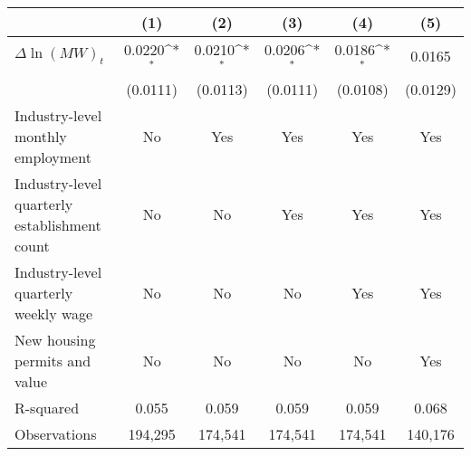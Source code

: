 {
\def\sym#1{\ifmmode^{#1}\else\(^{#1}\)\fi}
\begin{tabular}{l*{5}{c}}
\hline\hline
          &\multicolumn{1}{c}{(1)}         &\multicolumn{1}{c}{(2)}         &\multicolumn{1}{c}{(3)}         &\multicolumn{1}{c}{(4)}         &\multicolumn{1}{c}{(5)}         \\
\hline
$\Delta \ln(MW)_{t}$&   0.0220\sym{*}  &   0.0210\sym{*}  &   0.0206\sym{*}  &   0.0186\sym{*}  &   0.0165         \\
          & (0.0111)         & (0.0113)         & (0.0111)         & (0.0108)         & (0.0129)         \\
\hline
Industry-level monthly employment&       No         &      Yes         &      Yes         &      Yes         &      Yes         \\
Industry-level quarterly establishment count&       No         &       No         &      Yes         &      Yes         &      Yes         \\
Industry-level quarterly weekly wage&       No         &       No         &       No         &      Yes         &      Yes         \\
New housing permits and value&       No         &       No         &       No         &       No         &      Yes         \\
R-squared &    0.055         &    0.059         &    0.059         &    0.059         &    0.068         \\
Observations&  194,295         &  174,541         &  174,541         &  174,541         &  140,176         \\
\hline\hline
\end{tabular}
}
